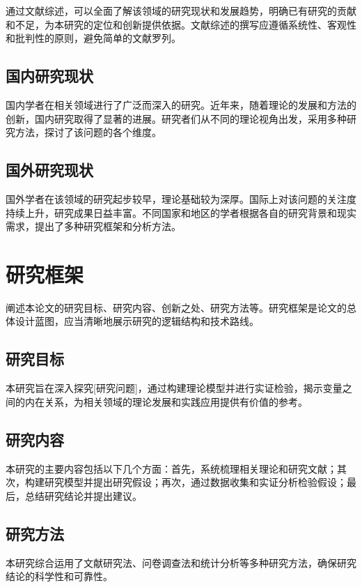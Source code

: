 \documentclass[numbering=arabic,fontset=auto]{jnuthesis}
\begin{document}
通过文献综述，可以全面了解该领域的研究现状和发展趋势，明确已有研究的贡献和不足，为本研究的定位和创新提供依据。文献综述的撰写应遵循系统性、客观性和批判性的原则，避免简单的文献罗列。

\subsection{国内研究现状}

国内学者在相关领域进行了广泛而深入的研究。近年来，随着理论的发展和方法的创新，国内研究取得了显著的进展。研究者们从不同的理论视角出发，采用多种研究方法，探讨了该问题的各个维度。

\subsection{国外研究现状}

国外学者在该领域的研究起步较早，理论基础较为深厚。国际上对该问题的关注度持续上升，研究成果日益丰富。不同国家和地区的学者根据各自的研究背景和现实需求，提出了多种研究框架和分析方法。

\section{研究框架}

阐述本论文的研究目标、研究内容、创新之处、研究方法等。研究框架是论文的总体设计蓝图，应当清晰地展示研究的逻辑结构和技术路线。

\subsection{研究目标}

本研究旨在深入探究[研究问题]，通过构建理论模型并进行实证检验，揭示变量之间的内在关系，为相关领域的理论发展和实践应用提供有价值的参考。

\subsection{研究内容}

本研究的主要内容包括以下几个方面：首先，系统梳理相关理论和研究文献；其次，构建研究模型并提出研究假设；再次，通过数据收集和实证分析检验假设；最后，总结研究结论并提出建议。

\subsection{研究方法}

本研究综合运用了文献研究法、问卷调查法和统计分析等多种研究方法，确保研究结论的科学性和可靠性。
\end{document}
